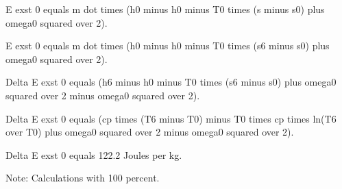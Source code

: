 E exst 0 equals m dot times (h0 minus h0 minus T0 times (s minus s0) plus omega0 squared over 2).

E exst 0 equals m dot times (h0 minus h0 minus T0 times (s6 minus s0) plus omega0 squared over 2).

Delta E exst 0 equals (h6 minus h0 minus T0 times (s6 minus s0) plus omega0 squared over 2 minus omega0 squared over 2).

Delta E exst 0 equals (cp times (T6 minus T0) minus T0 times cp times ln(T6 over T0) plus omega0 squared over 2 minus omega0 squared over 2).

Delta E exst 0 equals 122.2 Joules per kg.

Note: Calculations with 100 percent.